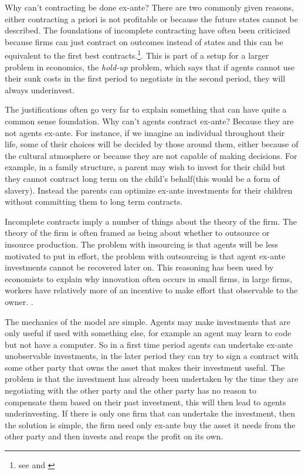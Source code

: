 \documentclass[12pt]{article}
\numberwithin{equation}{section}
\begin{document}
Why can't contracting be done ex-ante? There are two commonly given reasons, either contracting a priori is not profitable or because the future states cannot be described\cite{Hart1999}. The foundations of incomplete contracting have often been criticized because firms can just contract on outcomes instead of states and this can be equivalent to the first best contracts.\footnote{see \cite{Maskin2002} and \cite{maskin1999unforeseen}}. This is part of a setup for a larger problem in economics, the \textit{hold-up} problem, which says that if agents cannot use their sunk costs in the first period to negotiate in the second period, they will always underinvest. 

The justifications often go very far to explain something that can have quite a common sense foundation. Why can't agents contract ex-ante? Because they are not agents ex-ante. For instance, if we imagine an individual throughout their life, some of their choices will be decided by those around them, either because of the cultural atmosphere or because they are not capable of making decisions. For example, in a family structure, a parent may wish to invest for their child but they cannot contract long term on the child's behalf(this would be a form of slavery). Instead the parents can optimize ex-ante investments for their children without committing them to long term contracts. 

Incomplete contracts imply a number of things about the theory of the firm. The theory of the firm is often framed as being about whether to outsource or insource production. The problem with insourcing is that agents will be less motivated to put in effort, the problem with outsourcing is that agent ex-ante investments cannot be recovered later on. This reasoning has been used by economists to explain why innovation often occurs in small firms, in large firms, workers have relatively more of an incentive to make effort that observable to the owner. \cite{Holmstrom1989}. 

The mechanics of the model are simple. Agents may make investments that are only useful if used with something else, for example an agent may learn to code but not have a computer. So in a first time period agents can undertake ex-ante unobservable investments, in the later period they can try to sign a contract with some other party that owns the asset that makes their investment useful. The problem is that the investment has already been undertaken by the time they are negotiating with the other party and the other party has no reason to compensate them based on their past investment, this will then lead to agents underinvesting. If there is only one firm that can undertake the investment, then the solution is simple, the firm need only ex-ante buy the asset it needs from the other party and then invests and reaps the profit on its own. 
\end{document}
